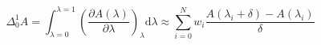 


\[ \Delta_0^1 A = \int_{\lambda=0}^{\lambda=1} \left( \frac{\partial
    A(\lambda)}{\partial\lambda} \right)_\lambda \mathrm{d}\lambda
\approx \sum_{i=0}^N w_i \frac{A(\lambda_{i} + \delta) -
  A(\lambda_i)}{\delta} \]


